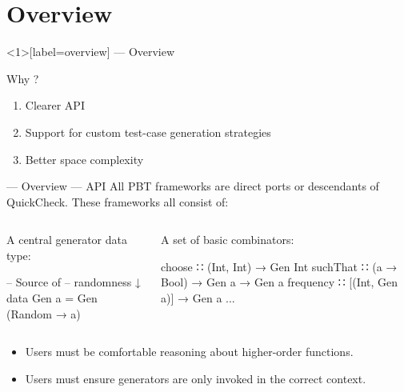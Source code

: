 \section{Overview}

\begin{frame}<1>[label=overview]{\halcheck{} --- Overview }
  \begin{block}{Why \halcheck?}
    \begin{enumerate}
      \item<alert@1> Clearer API
      \item<alert@2> Support for custom test-case generation strategies
      \item<alert@3> Better space complexity
    \end{enumerate}
  \end{block}
\end{frame}

\begin{frame}[fragile]{\halcheck{} --- Overview --- API}
  All PBT frameworks are direct ports or descendants of QuickCheck. These frameworks all consist of:

  \bigskip{}
  \begin{columns}[T,onlytextwidth]
    \begin{block}{A central generator data type:}
      \begin{haskellcode}
        --     Source of
        --     randomness ↓
        data Gen a = Gen (Random → a)
      \end{haskellcode}
    \end{block}

    \begin{block}{A set of basic combinators:}
      \begin{haskellcode}
        choose    ∷ (Int, Int) → Gen Int
        suchThat  ∷ (a → Bool) → Gen a → Gen a
        frequency ∷ [(Int, Gen a)] → Gen a
        ...
      \end{haskellcode}
    \end{block}
  \end{columns}

  \pause{}

  \bigskip{}

  \begin{itemize}
    \item Users must be comfortable reasoning about higher-order functions.
    \item Users must ensure generators are only invoked in the \alert{correct context}.
  \end{itemize}
\end{frame}

